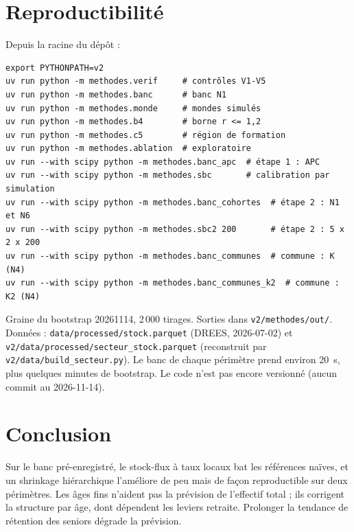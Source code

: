 \documentclass[11pt]{article}
\begin{document}
\section{Reproductibilité}
Depuis la racine du dépôt :
\begin{verbatim}
export PYTHONPATH=v2
uv run python -m methodes.verif     # contrôles V1-V5
uv run python -m methodes.banc      # banc N1
uv run python -m methodes.monde     # mondes simulés
uv run python -m methodes.b4        # borne r <= 1,2
uv run python -m methodes.c5        # région de formation
uv run python -m methodes.ablation  # exploratoire
uv run --with scipy python -m methodes.banc_apc  # étape 1 : APC
uv run --with scipy python -m methodes.sbc       # calibration par simulation
uv run --with scipy python -m methodes.banc_cohortes  # étape 2 : N1 et N6
uv run --with scipy python -m methodes.sbc2 200       # étape 2 : 5 x 2 x 200
uv run --with scipy python -m methodes.banc_communes  # commune : K (N4)
uv run --with scipy python -m methodes.banc_communes_k2  # commune : K2 (N4)
\end{verbatim}
Graine du bootstrap 20261114, 2\,000 tirages. Sorties dans \texttt{v2/methodes/out/}. Données :
\texttt{data/processed/stock.parquet} (DREES, 2026-07-02) et
\texttt{v2/data/processed/secteur\_stock.parquet} (reconstruit par \texttt{v2/data/build\_secteur.py}).
Le banc de chaque périmètre prend environ 20\mesure{}~s, plus quelques minutes de bootstrap. Le code
n'est pas encore versionné (aucun commit au 2026-11-14).

\section{Conclusion}
\label{sec:conclusion}
Sur le banc pré-enregistré, le stock-flux à taux locaux bat les références naïves, et un shrinkage
hiérarchique l'améliore de peu mais de façon reproductible sur deux périmètres. Les âges fins n'aident
pas la prévision de l'effectif total ; ils corrigent la structure par âge, dont dépendent les leviers
retraite. Prolonger la tendance de rétention des seniors dégrade la prévision.
\end{document}
